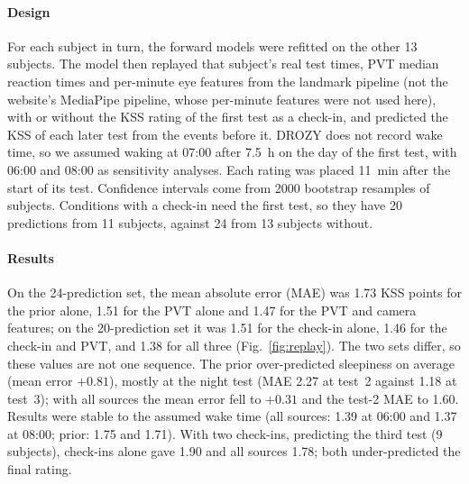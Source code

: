 \paragraph*{Design} For each subject in turn, the forward models were refitted on the other 13 subjects. The model then replayed that subject's real test times, PVT median reaction times and per-minute eye features from the landmark pipeline (not the website's MediaPipe pipeline, whose per-minute features were not used here), with or without the KSS rating of the first test as a check-in, and predicted the KSS of each later test from the events before it. DROZY does not record wake time, so we assumed waking at 07:00 after 7.5~h on the day of the first test, with 06:00 and 08:00 as sensitivity analyses. Each rating was placed 11~min after the start of its test. Confidence intervals come from 2000 bootstrap resamples of subjects. Conditions with a check-in need the first test, so they have 20 predictions from 11 subjects, against 24 from 13 subjects without.

\paragraph*{Results} On the 24-prediction set, the mean absolute error (MAE) was 1.73 KSS points for the prior alone, 1.51 for the PVT alone and 1.47 for the PVT and camera features; on the 20-prediction set it was 1.51 for the check-in alone, 1.46 for the check-in and PVT, and 1.38 for all three (Fig.~\ref{fig:replay}). The two sets differ, so these values are not one sequence. The prior over-predicted sleepiness on average (mean error $+0.81$), mostly at the night test (MAE 2.27 at test~2 against 1.18 at test~3); with all sources the mean error fell to $+0.31$ and the test-2 MAE to 1.60. Results were stable to the assumed wake time (all sources: 1.39 at 06:00 and 1.37 at 08:00; prior: 1.75 and 1.71). With two check-ins, predicting the third test (9 subjects), check-ins alone gave 1.90 and all sources 1.78; both under-predicted the final rating.

